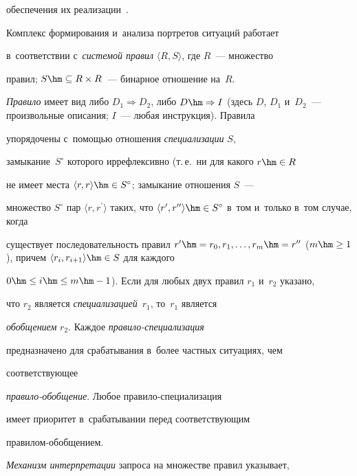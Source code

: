 обеспечения их реализации~\cite{16-il}.


  


  Комплекс формирования и~анализа портретов ситуаций работает 


  в~соответствии с~\textit{системой правил} $\langle R, S\rangle$, где $R$~--- множество 


правил; $S\hm\subseteq R\times R$~--- бинарное отношение на~$R$. 


\textit{Правило} имеет вид либо $D_1\Rightarrow D_2$, либо $D\hm\Rightarrow 


I$ (здесь $D$, $D_1$ и~$D_2$~--- произвольные описания; $I$~--- любая инструкция). Правила 


упорядочены с~помощью отношения \textit{специализации} $S$, 


замыкание~$S^\circ$ которого иррефлексивно (т.\,е.\ ни для какого $r\hm\in R$ 


не имеет места $\langle r, r\rangle \hm \in S^\circ$; замыкание отношения $S$~--- 


множество $S^\circ$ пар $\langle r, r^\prime \rangle$ таких, что $\langle r^\prime, 


r^{\prime\prime}\rangle \hm\in S^\circ$ в~том и~только в~том случае, когда 


существует последовательность правил $r^\prime\hm= r_0, r_1,\ldots ,r_m \hm= 


r^{\prime\prime}$ ($m\hm \geq 1$), причем $\langle r_i, r_{i+1}\rangle \hm\in S$ для каждого 


$0 \hm\leq  i \hm\leq m\hm- 1$). Если для любых двух правил $r_1$ и~$r_2$ указано, 


что $r_2$ является \textit{специализацией}~$r_1$, то~$r_1$ является 


\textit{обобщением} $r_2$. Каждое \textit{пра\-ви\-ло-спе\-ци\-а\-ли\-за\-ция} 


предназначено для срабатывания в~более част\-ных ситуациях, чем 


со\-от\-вет\-ст\-ву\-ющее  


\textit{пра\-ви\-ло-обоб\-ще\-ние}. Любое пра\-ви\-ло-спе\-ци\-а\-ли\-за\-ция 


имеет приоритет в~срабатывании перед со\-от\-вет\-ст\-ву\-ющим  


пра\-ви\-лом-обоб\-ще\-нием.


  


  \textit{Механизм интерпретации} запроса на множестве правил указывает, 


